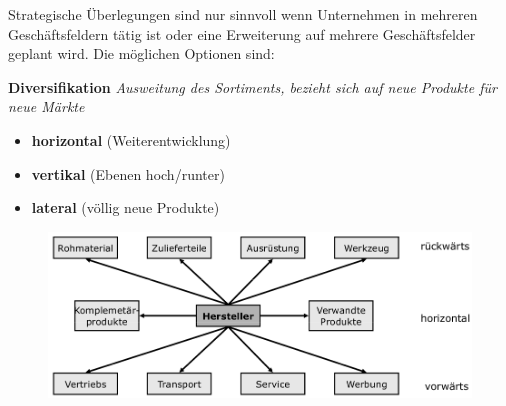 \documentclass[a4paper,11pt, twoside]{article}
\begin{document}
Strategische Überlegungen sind nur sinnvoll wenn Unternehmen in mehreren Geschäftsfeldern tätig ist oder eine Erweiterung auf mehrere Geschäftsfelder geplant wird. 
Die möglichen Optionen sind:

\textbf{Diversifikation}
\textit{Ausweitung des Sortiments, bezieht sich auf neue Produkte für neue Märkte}\\
\begin{itemize}
	\item \textbf{horizontal} (Weiterentwicklung)\\
	\item \textbf{vertikal} (Ebenen hoch/runter)\\
	\item \textbf{lateral} (völlig neue Produkte)
\end{itemize}
\begin{figure}[h]
 \begin{center}
   \includegraphics[scale=0.3]{bilder/diversifikation.png}
 \end{center}
\end{figure}
\newpage
\end{document}

